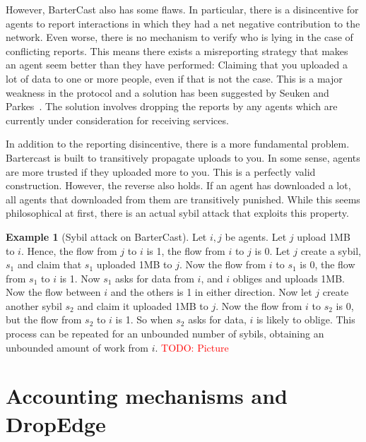 \documentclass[a4paper,11pt]{book}
\newcommand\musthave[1]{\textcolor{red}{TODO: #1}}
\theoremstyle{definition}
\newtheorem*{example}{Example}
\begin{document}
However, BarterCast also has some flaws. In particular, there is a disincentive for agents to report
interactions in which they had a net negative contribution to the network. Even worse, there is no mechanism
to verify who is lying in the case of conflicting reports. This means there exists a
misreporting strategy that makes an agent seem better than they have performed:
Claiming that you uploaded a lot of data to one or more people, even if that is not
the case. This is a major weakness in the protocol and a solution has been suggested by Seuken and 
Parkes~\cite{seuken2010accounting}. The solution involves dropping the reports by any agents
which are currently under consideration for receiving services.

In addition to the reporting disincentive, there is a more fundamental problem. Bartercast is built
to transitively propagate uploads to you. In some sense, agents are more trusted if they uploaded
more to you. This is a perfectly valid construction. However, the reverse also holds. If an agent
has downloaded a lot, all agents that downloaded from them are transitively punished. While
this seems philosophical at first, there is an actual sybil
attack that exploits this property.

\begin{example}[Sybil attack on BarterCast]
     Let $i, j$ be agents. Let $j$ upload 1MB to $i$. Hence, the flow from $j$ to $i$ is 1, the flow
    from $i$ to $j$ is 0. Let $j$ create a sybil, $s_1$ and claim that $s_1$ uploaded 1MB to $j$.
    Now the flow from $i$ to $s_1$ is $0$, the flow from $s_1$ to $i$ is 1. Now $s_1$ asks
    for data from $i$, and $i$ obliges and uploads 1MB. Now the flow between $i$ and the others is
    1 in either direction. Now let $j$ create another sybil $s_2$ and claim it uploaded 1MB to $j$. 
    Now the flow from $i$ to $s_2$ is 0, but the flow from $s_2$ to $i$ is 1. 
    So when $s_2$ asks for data, $i$ is likely to oblige. This process can be repeated for an unbounded
    number of sybils, obtaining an unbounded amount of work from $i$. \musthave{Picture}
    \label{ex:bc_sybil}
\end{example}

\section{Accounting mechanisms and DropEdge}
\end{document}
